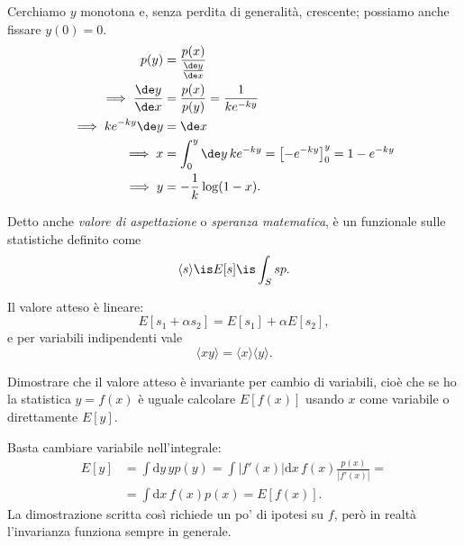 \begin{solution}
	Cerchiamo $y$ monotona e, senza perdita di generalità, crescente; possiamo anche fissare $y(0) = 0$.
	\begin{align*}
		p(y) &= \frac{p(x)}{\frac{\de y}{\de x}} \\
		\implies \frac{\de y}{\de x} &= \frac{p(x)}{p(y)} = \frac{1}{ke^{-ky}}\\
		\implies ke^{-ky}\de y &= \de x \\
		\implies x &= \int_{0}^{y} \de y\, ke^{-ky} = \left[ -e^{-ky} \right]_{0}^{y} = 1 - e^{-ky} \\
		\implies y &= -\frac1k \log(1-x).
	\end{align*}
\end{solution}

\begin{definition}
	Detto anche \emph{valore di aspettazione} o \emph{speranza matematica},
	è un funzionale sulle statistiche definito come
	\begin{equation*}
		\langle s \rangle \is E[s] \is \int_S sp.
	\end{equation*}
\end{definition}

\noindent Il valore atteso è lineare:
\begin{equation*}
	E[s_1+\alpha s_2] = E[s_1] + \alpha E[s_2],
\end{equation*}
e per variabili indipendenti vale
\begin{equation*}
	\langle xy \rangle = \langle x \rangle \langle y \rangle.
\end{equation*}

\begin{exercise}
    Dimostrare che il valore atteso è invariante per cambio di variabili,
    cioè che se ho la statistica $y = f(x)$ è uguale calcolare $E[f(x)]$
    usando $x$ come variabile o direttamente $E[y]$.
\end{exercise}

\begin{solution}
    Basta cambiare variabile nell'integrale:
    \begin{align*}
        E[y] &= \int \mathrm dy\, y p(y)
        = \int |f'(x)|\mathrm dx\, f(x) \frac{p(x)}{|f'(x)|} = \\
        &= \int \mathrm dx\, f(x)p(x) = E[f(x)].
    \end{align*}
    La dimostrazione scritta così richiede un po' di ipotesi su $f$, però
    in realtà l'invarianza funziona sempre in generale.
\end{solution}

